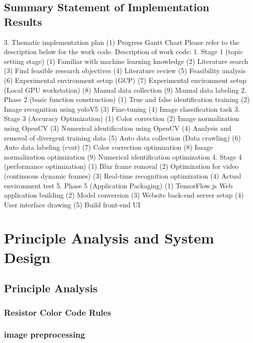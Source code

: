\documentclass{article}
\begin{document}
\subsection{Summary Statement of Implementation Results}
3. Thematic implementation plan
(1) Progress Gantt Chart
Please refer to the description below for the work code.
Description of work code:
1. Stage 1 (topic setting stage)
(1) Familiar with machine learning knowledge
(2) Literature search
(3) Find feasible research objectives
(4) Literature review
(5) Feasibility analysis
(6) Experimental environment setup (GCP)
(7) Experimental environment setup (Local GPU workstation)
(8) Manual data collection
(9) Manual data labeling
2. Phase 2 (basic function construction)
(1) True and false identification training
(2) Image recognition using yoloV5
(3) Fine-tuning
(4) Image classification task
3. Stage 3 (Accuracy Optimization)
(1) Color correction
(2) Image normalization using OpenCV
(3) Numerical identification using OpenCV
(4) Analysis and removal of divergent training data
(5) Auto data collection (Data crawling)
(6) Auto data labeling (cvat)
(7) Color correction optimization
(8) Image normalization optimization
(9) Numerical identification optimization
4. Stage 4 (performance optimization)
(1) Blur frame removal
(2) Optimization for video (continuous dynamic frames)
(3) Real-time recognition optimization
(4) Actual environment test
5. Phase 5 (Application Packaging)
(1) TensorFlow.js Web application building
(2) Model conversion
(3) Website back-end server setup
(4) User interface drawing
(5) Build front-end UI


\section{Principle Analysis and System Design}
\subsection{Principle Analysis}

\subsubsection{Resistor Color Code Rules}

\subsubsection{image preprocessing}

\end{document}
